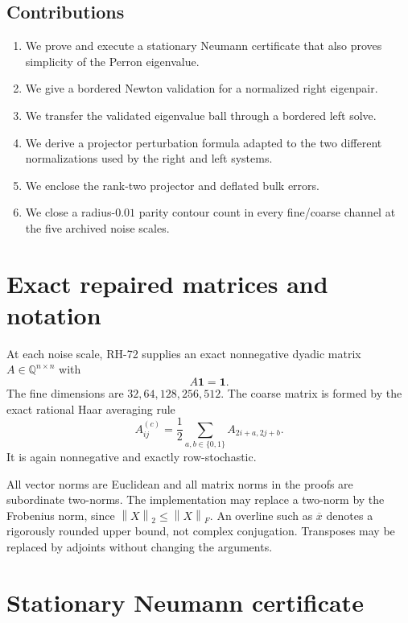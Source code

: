 \documentclass[11pt]{article}
\theoremstyle{definition}
\newcommand{\norm}[1]{\left\lVert#1\right\rVert}
\newcommand{\one}{\mathbf 1}
\begin{document}
\subsection*{Contributions}

\begin{enumerate}[leftmargin=2.2em]
 \item We prove and execute a stationary Neumann certificate that also proves
       simplicity of the Perron eigenvalue.
 \item We give a bordered Newton validation for a normalized right eigenpair.
 \item We transfer the validated eigenvalue ball through a bordered left solve.
 \item We derive a projector perturbation formula adapted to the two different
       normalizations used by the right and left systems.
 \item We enclose the rank-two projector and deflated bulk errors.
 \item We close a radius-$0.01$ parity contour count in every fine/coarse
       channel at the five archived noise scales.
\end{enumerate}

\section{Exact repaired matrices and notation}

At each noise scale, RH-72 supplies an exact nonnegative dyadic matrix
$A\in\mathbb Q^{n\times n}$ with
\begin{equation}
 A\one=\one.
 \label{eq:stochastic}
\end{equation}
The fine dimensions are $32,64,128,256,512$.  The coarse matrix is formed by
the exact rational Haar averaging rule
\begin{equation}
 A^{(c)}_{ij}=\frac12\sum_{a,b\in\{0,1\}}A_{2i+a,2j+b}.
 \label{eq:coarse}
\end{equation}
It is again nonnegative and exactly row-stochastic.

All vector norms are Euclidean and all matrix norms in the proofs are
subordinate two-norms.  The implementation may replace a two-norm by the
Frobenius norm, since $\norm X_2\le\norm X_F$.  An overline such as
$\overline x$ denotes a rigorously rounded upper bound, not complex
conjugation.  Transposes may be replaced by adjoints without changing the
arguments.

\section{Stationary Neumann certificate}
\label{sec:stationary}
\end{document}
